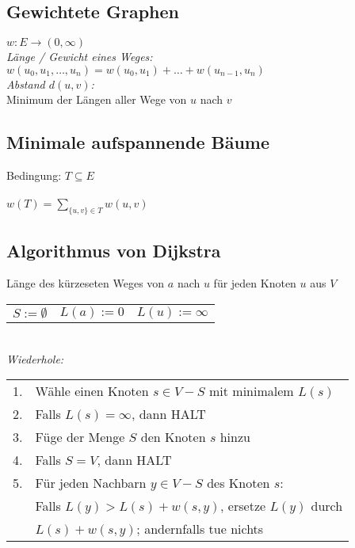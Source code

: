 \subsection{Gewichtete Graphen}
$ w : E \rightarrow ( 0, \infty) $ \\

\textit{Länge / Gewicht eines Weges:} \\
$w(u_0, u_1, \dots, u_n) = w(u_0, u_1) + \dots + w(u_{n-1}, u_n) $ \\

\textit{Abstand $d(u,v)$:} \\
Minimum der Längen aller Wege von $u$ nach $v$

\subsection{Minimale aufspannende Bäume}
Bedingung: $T \subseteq E $ \\
\\
$ w(T) = \sum_{\{u,v\} \in T} w(u,v) $

\subsection{Algorithmus von Dijkstra}
Länge des kürzeseten Weges von $a$ nach $u$ für jeden Knoten $u$ aus $V$ \\

\begin{tabular}{@{}lll}
    $ S := \emptyset $ & $ L(a) := 0$ & $L(u) := \infty $ \\
\end{tabular}\\

\textit{Wiederhole:}\\
\begin{tabular}{@{}ll}
    1. & Wähle einen Knoten $s \in V - S$ mit minimalem $L(s)$ \\
    2. & Falls $L(s) = \infty$, dann HALT \\
    3. & Füge der Menge $S$ den Knoten $s$ hinzu \\
    4. & Falls $S = V$, dann HALT \\
    5. & Für jeden Nachbarn $y \in V - S$ des Knoten $s$: \\
    & Falls $L(y) > L(s) + w(s, y)$, ersetze $L(y)$ durch \\ 
    & $L(s) + w(s, y)$; andernfalls tue nichts \\
\end{tabular}        

